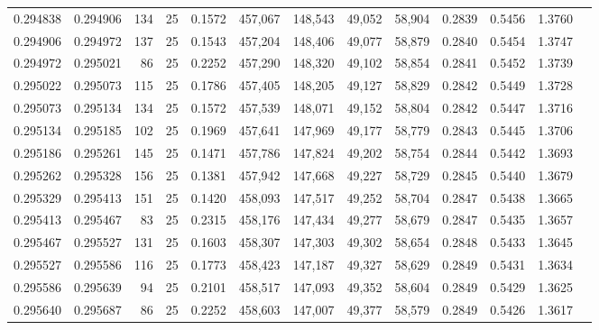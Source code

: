 \begin{tabular}{rrrrrrrrrrrrr}
0.294838 & 0.294906 &   134 &  25 &                                     0.1572 & 457,067 & 148,543 &  49,052 &  58,904 & 0.2839 & 0.5456 & 1.3760 \\
0.294906 & 0.294972 &   137 &  25 &                                     0.1543 & 457,204 & 148,406 &  49,077 &  58,879 & 0.2840 & 0.5454 & 1.3747 \\
0.294972 & 0.295021 &    86 &  25 &                                     0.2252 & 457,290 & 148,320 &  49,102 &  58,854 & 0.2841 & 0.5452 & 1.3739 \\
0.295022 & 0.295073 &   115 &  25 &                                     0.1786 & 457,405 & 148,205 &  49,127 &  58,829 & 0.2842 & 0.5449 & 1.3728 \\
0.295073 & 0.295134 &   134 &  25 &                                     0.1572 & 457,539 & 148,071 &  49,152 &  58,804 & 0.2842 & 0.5447 & 1.3716 \\
0.295134 & 0.295185 &   102 &  25 &                                     0.1969 & 457,641 & 147,969 &  49,177 &  58,779 & 0.2843 & 0.5445 & 1.3706 \\
0.295186 & 0.295261 &   145 &  25 &                                     0.1471 & 457,786 & 147,824 &  49,202 &  58,754 & 0.2844 & 0.5442 & 1.3693 \\
0.295262 & 0.295328 &   156 &  25 &                                     0.1381 & 457,942 & 147,668 &  49,227 &  58,729 & 0.2845 & 0.5440 & 1.3679 \\
0.295329 & 0.295413 &   151 &  25 &                                     0.1420 & 458,093 & 147,517 &  49,252 &  58,704 & 0.2847 & 0.5438 & 1.3665 \\
0.295413 & 0.295467 &    83 &  25 &                                     0.2315 & 458,176 & 147,434 &  49,277 &  58,679 & 0.2847 & 0.5435 & 1.3657 \\
0.295467 & 0.295527 &   131 &  25 &                                     0.1603 & 458,307 & 147,303 &  49,302 &  58,654 & 0.2848 & 0.5433 & 1.3645 \\
0.295527 & 0.295586 &   116 &  25 &                                     0.1773 & 458,423 & 147,187 &  49,327 &  58,629 & 0.2849 & 0.5431 & 1.3634 \\
0.295586 & 0.295639 &    94 &  25 &                                     0.2101 & 458,517 & 147,093 &  49,352 &  58,604 & 0.2849 & 0.5429 & 1.3625 \\
0.295640 & 0.295687 &    86 &  25 &                                     0.2252 & 458,603 & 147,007 &  49,377 &  58,579 & 0.2849 & 0.5426 & 1.3617 \\

\end{tabular}
